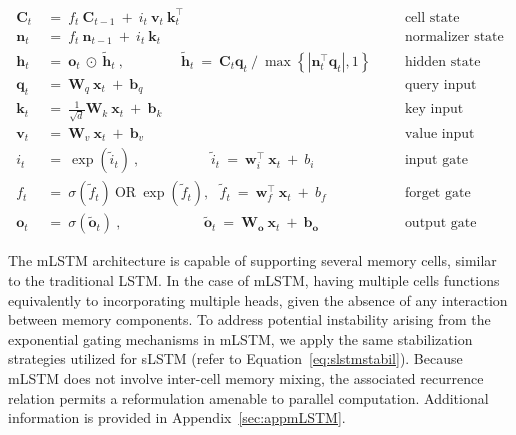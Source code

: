 \begin{align}
\label{eq:mlstm_recurrent_begin}
\mathbf{C}_t \ &= \  f_t \ \mathbf{C}_{t-1} \ + \ 
  i_t \ \mathbf{v}_t \ \mathbf{k}_t^\top & &  &\text{cell state} \\
\mathbf{n}_t \ &= \  f_t \ \mathbf{n}_{t-1} \ + \ 
  i_t \ \mathbf{k}_t & &  &\text{normalizer state} \\
\mathbf{h}_t  \ &= \ \mathbf{o}_t \ \odot \ \tilde{\mathbf{h}}_t
\ , \qquad \qquad 
\tilde{\mathbf{h}}_t \ = \   \mathbf{C}_t \mathbf{q}_t \ / \ 
  \max \left\{ |\mathbf{n}_t^\top \mathbf{q}_t|, 1 \right\} 
   &&&\text{hidden state} \\
\mathbf{q}_t \ &= \ \mathbf{W}_q \ \mathbf{x}_t \ + \ \mathbf{b}_q  & &  &\text{query input} \\
\mathbf{k}_t \ &= \ \frac{1}{\sqrt{d}} \mathbf{W}_k \ \mathbf{x}_t \ + \ \mathbf{b}_k  & &  &\text{key input} \\
\mathbf{v}_t \ &= \ \mathbf{W}_v \ \mathbf{x}_t \ + \ \mathbf{b}_v  & &  &\text{value input} \\
i_t \ &= \ \!\exp \!  \! \left( \tilde{i}_t  \right) \ , 
 \qquad \qquad \ \ \ \ \,
  \tilde{i}_t \ = \ \mathbf{w}^\top_{i} \ \mathbf{x}_t \ + \  b_{i} \ \ \ 
  &&&\text{input gate} \\
f_t \ &= \ \sigma \!  \left(  \tilde{f}_t \right) \ \text{OR} \ \!\exp \!  \! \left(  \tilde{f}_t \right) , \ \ \: \!
\tilde{f}_t \ = \ \mathbf{w}^\top_{f} \ \mathbf{x}_t  \ + \
  b_{f}
  &&& \text{forget gate} \\
\label{eq:mlstm_recurrent_end}
\mathbf{o}_t \ &= \ \sigma \left( \tilde{\mathbf{o}}_t \right) \ , \qquad \qquad \quad \ \ \ \,
  \tilde{\mathbf{o}}_t  \ = \ \mathbf{W}_{\mathbf{o}} \ \mathbf{x}_t \ + \
  \mathbf{b}_{\mathbf{o}}
  &&&\text{output gate} 
\end{align}

The mLSTM architecture is capable of supporting several memory cells, similar to the traditional LSTM. In the case of mLSTM, having multiple cells functions equivalently to incorporating multiple heads, given the absence of any interaction between memory components. To address potential instability arising from the exponential gating mechanisms in mLSTM, we apply the same stabilization strategies utilized for sLSTM (refer to Equation~\ref{eq:slstmstabil}). Because mLSTM does not involve inter-cell memory mixing, the associated recurrence relation permits a reformulation amenable to parallel computation. Additional information is provided in Appendix~\ref{sec:appmLSTM}.

